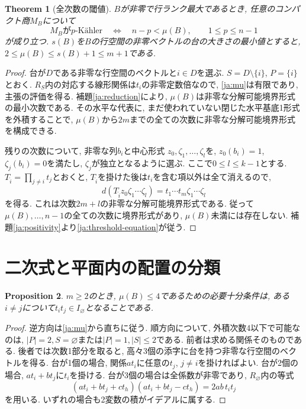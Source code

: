 \documentclass[12pt]{amsart}
\newcommand{\thmword}{Theorem}
\newcommand{\propword}{Proposition}
\newtheorem{thm}{\thmword}[section]
\newtheorem{prop}[thm]{\propword}
\theoremstyle{definition}
\theoremstyle{remark}
\numberwithin{equation}{section}
\begin{document}
\begin{thm}[全次数の閾値]\label{ja:threshold}
$B$が非零で行ランク最大であるとき, 任意のコンパクト商$M_B$について
\begin{equation}\label{ja:threshold-equation}
 M_B\text{が}p\text{-K\"ahler}
 \quad\Longleftrightarrow\quad n-p<\mu(B),\qquad 1\leq p\leq n-1
\end{equation}
が成り立つ.
$s(B)$を$B$の行空間の非零ベクトルの台の大きさの最小値とすると,
$2\leq\mu(B)\leq s(B)+1\leq m+1$である.
\end{thm}
\begin{proof}
台が$D$である非零な行空間のベクトルと$i\in D$を選ぶ.
$S=D\setminus\{i\}$, $P=\{i\}$とおく.
$R_S$内の対応する線形関係は$t_i$の非零定数倍なので,
\eqref{ja:mu}は有限であり, 主張の評価を得る.
補題\ref{ja:reduction}により, $\mu(B)$は非零な分解可能境界形式の最小次数である.
その水平な代表に, まだ使われていない閉じた水平基底1形式を外積することで,
$\mu(B)$から$2m$までの全ての次数に非零な分解可能境界形式を構成できる.

残りの次数について, 非零な列$b_i$と中心形式
$z_0,\zeta_1,\ldots,\zeta_l$を,
$z_0(b_i)=1$, $\zeta_j(b_i)=0$を満たし,
$\zeta_j$が独立となるように選ぶ. ここで$0\leq l\leq k-1$とする.
$T_{\widehat i}=\prod_{j\ne i}t_j$とおくと,
$T_{\widehat i}$を掛けた後は$t_i$を含む項以外は全て消えるので,
\[
 d(T_{\widehat i}z_0\zeta_1\cdots\zeta_l)
   =t_1\cdots t_m\zeta_1\cdots\zeta_l
\]
を得る. これは次数$2m+l$の非零な分解可能境界形式である.
従って$\mu(B),\ldots,n-1$の全ての次数に境界形式があり,
$\mu(B)$未満には存在しない.
補題\ref{ja:positivity}より\eqref{ja:threshold-equation}が従う.
\end{proof}

\section{二次式と平面内の配置の分類}
\begin{prop}\label{ja:degree-four}
$m\geq2$のとき, $\mu(B)\leq4$であるための必要十分条件は,
ある$i\ne j$について$t_i t_j\in I_{\varnothing}$となることである.
\end{prop}
\begin{proof}
逆方向は\eqref{ja:mu}から直ちに従う.
順方向について, 外積次数4以下で可能なのは,
$|P|=2,S=\varnothing$または$|P|=1,|S|\leq2$である.
前者は求める関係そのものである.
後者では次数1部分を取ると, 高々3個の添字に台を持つ非零な行空間のベクトルを得る.
台が1個の場合, 関係$a t_i$に任意の$t_j$, $j\ne i$を掛ければよい.
台が2個の場合, $a t_i+b t_j$に$t_i$を掛ける.
台が3個の場合は全係数が非零であり, $R_{\varnothing}$内の等式
\[
 (a t_i+b t_j+c t_h)(a t_i+b t_j-c t_h)=2ab\,t_i t_j
\]
を用いる. いずれの場合も2変数の積がイデアルに属する.
\end{proof}
\end{document}
